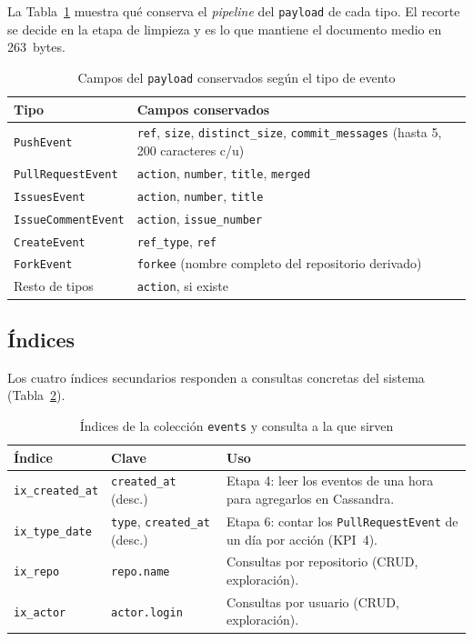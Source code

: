 La Tabla~\ref{tab:payload} muestra qué conserva el \textit{pipeline} del \texttt{payload} de cada tipo. El recorte se decide en la etapa de limpieza y es lo que mantiene el documento medio en 263~bytes.

\begin{table}[H]
\centering
\caption{Campos del \texttt{payload} conservados según el tipo de evento}
\label{tab:payload}
\vspace{0.2cm}
\small
\begin{tabular}{@{}lp{9.4cm}@{}}
\toprule
\textbf{Tipo} & \textbf{Campos conservados} \\
\midrule
\texttt{PushEvent}         & \texttt{ref}, \texttt{size}, \texttt{distinct\_size}, \texttt{commit\_messages} (hasta 5, 200 caracteres c/u) \\
\texttt{PullRequestEvent}  & \texttt{action}, \texttt{number}, \texttt{title}, \texttt{merged} \\
\texttt{IssuesEvent}       & \texttt{action}, \texttt{number}, \texttt{title} \\
\texttt{IssueCommentEvent} & \texttt{action}, \texttt{issue\_number} \\
\texttt{CreateEvent}       & \texttt{ref\_type}, \texttt{ref} \\
\texttt{ForkEvent}         & \texttt{forkee} (nombre completo del repositorio derivado) \\
Resto de tipos             & \texttt{action}, si existe \\
\bottomrule
\end{tabular}
\end{table}

\subsection{Índices}

Los cuatro índices secundarios responden a consultas concretas del sistema (Tabla~\ref{tab:indices-mongo}).

\begin{table}[H]
\centering
\caption{Índices de la colección \texttt{events} y consulta a la que sirven}
\label{tab:indices-mongo}
\vspace{0.2cm}
\small
\begin{tabular}{@{}llp{7.2cm}@{}}
\toprule
\textbf{Índice} & \textbf{Clave} & \textbf{Uso} \\
\midrule
\texttt{ix\_created\_at} & \texttt{created\_at} (desc.)              & Etapa 4: leer los eventos de una hora para agregarlos en Cassandra. \\
\texttt{ix\_type\_date}  & \texttt{type}, \texttt{created\_at} (desc.) & Etapa 6: contar los \texttt{PullRequestEvent} de un día por acción (KPI~4). \\
\texttt{ix\_repo}        & \texttt{repo.name}                          & Consultas por repositorio (CRUD, exploración). \\
\texttt{ix\_actor}       & \texttt{actor.login}                        & Consultas por usuario (CRUD, exploración). \\
\bottomrule
\end{tabular}
\end{table}

